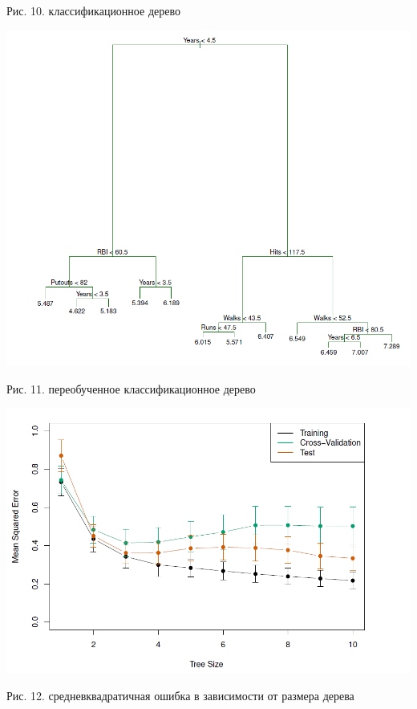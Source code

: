 \documentclass{article}
\begin{document}
\begin{center}
	Рис. 10. классификационное дерево
\end{center}
\begin{center}
	\includegraphics[scale=0.3]{pic63}
\end{center}
\begin{center}
	Рис. 11. переобученное классификационное дерево
\end{center}
\begin{center}
	\includegraphics[scale=0.3]{pic64}
\end{center}
\begin{center}
	Рис. 12. средневквадратичная ошибка в зависимости от размера дерева
\end{center}
\end{document}
